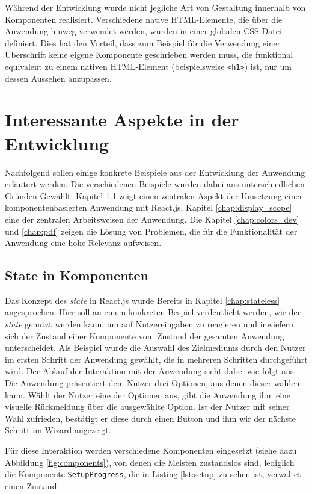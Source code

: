 Während der Entwicklung wurde nicht jegliche Art von Gestaltung innerhalb von Komponenten realisiert. Verschiedene native HTML-Elemente, die über die Anwendung hinweg verwendet werden, wurden in einer globalen CSS-Datei definiert. Dies hat den Vorteil, dass zum Beispiel für die Verwendung einer Überschrift keine eigene Komponente geschrieben werden muss, die funktional equivalent zu einem nativen HTML-Element (beispielsweise \verb|<h1>|) ist, nur um dessen Aussehen anzupassen.

\section{Interessante Aspekte in der Entwicklung}
Nachfolgend sollen einige konkrete Beispiele aus der Entwicklung der Anwendung erläutert werden. Die verschiedenen Beispiele wurden dabei aus unterschiedlichen Gründen Gewählt:
Kapitel \ref{chap:state_component} zeigt einen zentralen Aspekt der Umsetzung einer komponentenbasierten Anwendung mit React.js, Kapitel \ref{chap:display_scope} eine der zentralen Arbeitsweisen der Anwendung. Die Kapitel \ref{chap:colors_dev} und \ref{chap:pdf} zeigen die Lösung von Problemen, die für die Funktionalität der Anwendung eine hohe Relevanz aufweisen.


\subsection{State in Komponenten}
\label{chap:state_component}
Das Konzept des \textit{state} in React.js wurde Bereits in Kapitel \ref{chap:stateless} angesprochen. Hier soll an einem konkreten Bespiel verdeutlicht werden, wie der \textit{state} genutzt werden kann, um auf Nutzereingaben zu reagieren und inwiefern sich der Zustand einer Komponente vom Zustand der gesamten Anwendung unterscheidet.
Als Beispiel wurde die Auswahl des Zielmediums durch den Nutzer im ersten Schritt der Anwendung gewählt, die in mehreren Schritten durchgeführt wird.
Der Ablauf der Interaktion mit der Anwendung sieht dabei wie folgt aus:
Die Anwendung präsentiert dem Nutzer drei Optionen, aus denen dieser wählen kann. Wählt der Nutzer eine der Optionen aus, gibt die Anwendung ihm eine visuelle Rückmeldung über die ausgewählte Option. Ist der Nutzer mit seiner Wahl zufrieden, bestätigt er diese durch einen Button und  ihm wir der nächste Schritt im Wizard angezeigt.

Für diese Interaktion werden verschiedene Komponenten eingesetzt (siehe dazu Abbildung \ref{fig:components}), von denen die Meisten zustandslos sind, lediglich die Komponente \verb|SetupProgress|, die in Listing \ref{lst:setup} zu sehen ist\footnotemark{}, verwaltet einen Zustand.

